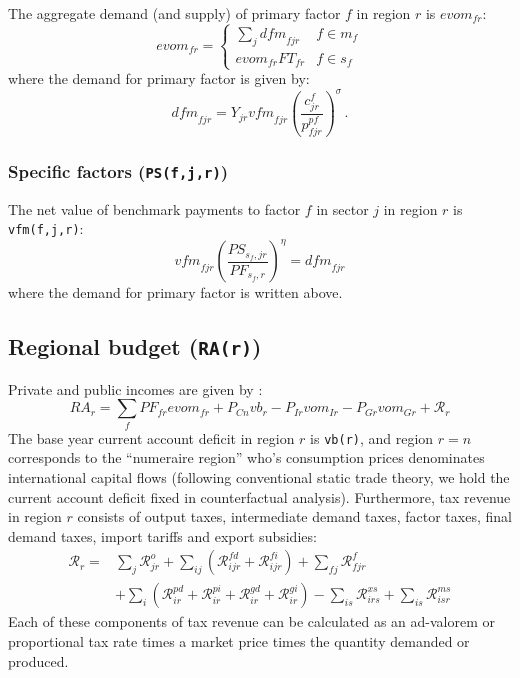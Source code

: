 The aggregate demand (and supply) of primary factor $f$ in region $r$
is $\textit{evom}_{fr}$:
\begin{equation}
\textit{evom}_{fr} = \left\{
\begin{array}{lr}
\sum_j \textit{dfm}_{fjr} & f \in m_f \\
\textit{evom}_{fr} \textit{FT}_{fr} & f \in s_f
\end{array} \right.
\end{equation}
where the demand for primary factor is given by:
$$\textit{dfm}_{fjr}  = Y_{jr} \textit{vfm}_{fjr}
\left( \frac{c^f_{jr}}{p^{pf}_{fjr}}\right)^\sigma\,.$$

\subsubsection[Specific factors]{Specific factors (\texttt{PS(f,j,r)})}

The net value of benchmark payments to factor $f$ in sector $j$ in
region $r$ is \texttt{vfm(f,j,r)}:
\begin{equation}
\textit{vfm}_{fjr} \left( \frac{\mathit{PS}_{s_{f},jr}}{\mathit{PF}_{s_{f},r}} \right)^\eta =
\textit{dfm}_{fjr}\end{equation}
where the demand for primary factor is written above.

\subsection[Regional budget]{Regional budget (\texttt{RA(r)})}

Private and public incomes are given by :
\begin{equation}
\textit{RA}_r = \sum_f \mathit{PF}_{fr} \textit{evom}_{fr} + P_{Cn}
\textit{vb}_r -  P_{Ir} \textit{vom}_{Ir} - P_{Gr}
\textit{vom}_{Gr}  + \mathcal{R}_r
\end{equation}
The base year current account deficit in region $r$ is \texttt{vb(r)},
and region $r=n$ corresponds to the ``numeraire region'' who's
consumption prices denominates international capital flows (following
conventional static trade theory, we hold the current account deficit
fixed in counterfactual analysis).
Furthermore, tax revenue in region $r$ consists of output taxes,
intermediate demand taxes, factor taxes, final demand taxes, import
tariffs and export subsidies:
\begin{equation}
\begin{array}{ll}
\mathcal{R}_r = & \sum_j \mathcal{R}^o_{jr}
                 + \sum_{ij} \left( \mathcal{R}^{fd}_{ijr} +
                 \mathcal{R}^{fi}_{ijr} \right)
                 + \sum_{fj} \mathcal{R}^f_{fjr} \\
                &+ \sum_{i}  \left( \mathcal{R}^{pd}_{ir} +
                 \mathcal{R}^{pi}_{ir} + \mathcal{R}^{gd}_{ir} +
                 \mathcal{R}^{gi}_{ir}  \right)
                 - \sum_{is} \mathcal{R}^{xs}_{irs}
                 + \sum_{is} \mathcal{R}^{ms}_{isr}
\end{array}
\end{equation}
Each of these components of tax revenue can be calculated as an
ad-valorem or proportional tax rate times a market price times the
quantity demanded or produced.

